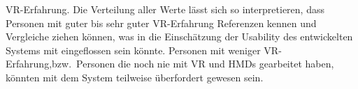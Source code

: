 VR-Erfahrung. Die Verteilung aller Werte lässt sich so interpretieren, dass Personen mit guter bis sehr guter VR-Erfahrung Referenzen kennen und Vergleiche ziehen können, was in die Einschätzung der Usability des entwickelten Systems mit eingeflossen sein könnte. Personen mit weniger VR-Erfahrung,bzw.~Personen die noch nie mit VR und HMDs gearbeitet haben, könnten mit dem System teilweise überfordert gewesen sein.

